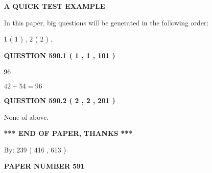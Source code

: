\documentclass[12pt]{article}
\begin{document}
   
   
   
 \vspace{0.2in}
{\LARGE {\textbf{ A QUICK TEST EXAMPLE}}}
   
   
   
\vspace{0.2in}
   
In this paper, big questions will be generated in the following order: 
   
   
   1 ( 1 )
 ,
   2 ( 2 )
 .
  
\vspace{0.2in}
  
{\textbf{\Large{QUESTION
590.1 
 ( 1 , 1 , 101 )
}}}
  
  
 
 
\noindent{}

96
 
 
 
 
\noindent{}

$ %
42 +  %
54=   %
96$
 
 
  
\vspace{0.2in}
  
{\textbf{\Large{QUESTION
590.2 
 ( 2 , 2 , 201 )
}}}
  
  
 
 
\noindent{}
 
 
 None of above.
 
 
 
 
   
   
 \vspace{0.2in}
 
   
   
   
   
\vspace{1.0in} 
{\textbf{\large{ *** END OF PAPER, THANKS *** }}} 
   
   
\hspace{1.0in} By: 
 239 ( 416 ,  613 )
   
   
   
   
\newpage 
\setcounter{page}{ 
   591001 } 
   
   
   
   
 {\textbf{ \Large{ PAPER NUMBER  591  }}}
   
\end{document}
